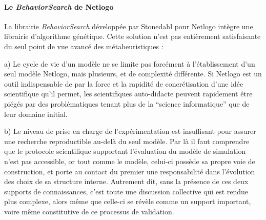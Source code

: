 \paragraph{Le \textit{BehaviorSearch} de Netlogo}

La librairie \textit{BehaviorSearch} développée par Stonedahl pour Netlogo intègre une librairie d'algorithme génétique. Cette solution n'est pas entièrement satisfaisante du seul point de vue avancé des métaheuristiques :

a) Le cycle de vie d'un modèle ne se limite pas forcément à l'établissement d'un seul modèle Netlogo, mais plusieurs, et de complexité différente. Si Netlogo est un outil indispensable de par la force et la rapidité de concrétisation d'une idée scientifique qu'il permet, les scientifiques auto-didacte peuvent rapidement être piégés par des problématiques tenant plus de la \enquote{science informatique} que de leur domaine initial.

b) Le niveau de prise en charge de l'expérimentation est insuffisant pour assurer une recherche reproductible au-delà du seul modèle. Par là il faut comprendre que le protocole scientifique supportant l'évaluation du modèle de simulation n'est pas accessible, or tout comme le modèle, celui-ci possède sa propre voie de construction, et porte au contact du premier une responsabilité dans l'évolution des choix de sa structure interne. Autrement dit, sans la présence de ces deux supports de connaissances, c'est toute une discussion collective qui est rendue plus complexe, alors même que celle-ci se révèle comme un support important, voire même constitutive de ce processus de validation.

